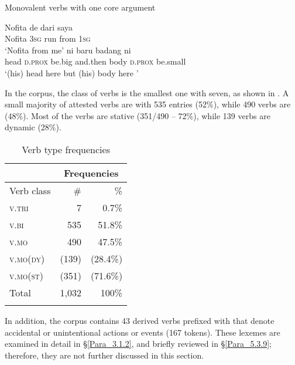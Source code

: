 \begin{styleExampleTitle}
Monovalent verbs with one core argument
\end{styleExampleTitle}
\ea
\label{Example_5.97}
\gll  Nofita  de    dari  saya\\
 Nofita  \textsc{3sg}  run  from  \textsc{1sg}\\
\glt 
‘Nofita  from me’ \textstyleExampleSource{[081025-006-Cv.0322]}
\z
\ea
\label{Example_5.98}
 {ni} {} {baru} {badang} {ni} {}\\ %
 head  \textsc{d.prox}  be.big  and.then  body  \textsc{d.prox}  be.small\\
\glt 
‘(his) head here  but (his) body here ’ \textstyleExampleSource{[081025-006-Cv.0278]}
\z


In the corpus, the class of  verbs is the smallest one with seven, as shown in . A small majority of attested verbs are  with 535 entries (52\%), while 490 verbs are  (48\%). Most of the  verbs are stative (351/490 – 72\%), while 139 verbs are dynamic (28\%).


\begin{table}
\caption{Verb type frequencies}\label{Table_5.15}

\begin{tabular}{lrr}
\lsptoprule
 & \multicolumn{2}{c}{ Frequencies}\\
\midrule
Verb class &  \# &  \%\\
\midrule
\textsc{v.tri} &  7 &  0.7\%\\
\textsc{v.bi} &  535 &  51.8\%\\
\textsc{v.mo} &  490 &  47.5\%\\
\hspace{2mm}\textsc{v.mo}(\textsc{dy}) &  (139) &  (28.4\%)\\
\hspace{2mm}\textsc{v.mo}(\textsc{st}) &  (351) &  (71.6\%)\\
\midrule
Total &  1,032 &  100\%\\
\lspbottomrule
\end{tabular}
\end{table}

In addition, the corpus contains 43 derived  verbs prefixed with  that denote accidental or unintentional actions or events (167 tokens). These lexemes are examined in detail in §\ref{Para_3.1.2}, and briefly reviewed in §\ref{Para_5.3.9}; therefore, they are not further discussed in this section.


